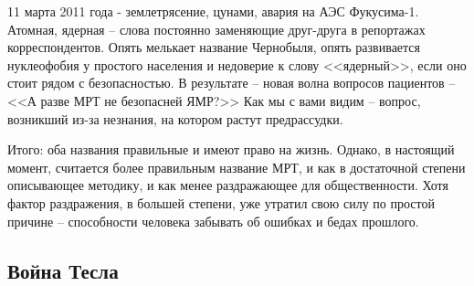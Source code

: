 11 марта 2011 года - землетрясение, цунами, авария на АЭС Фукусима-1. Атомная, ядерная -- слова постоянно заменяющие друг-друга в репортажах корреспондентов. Опять мелькает название Чернобыля, опять развивается нуклеофобия у простого населения и недоверие к слову <<ядерный>>, если оно стоит рядом с безопасностью. В результате -- новая волна вопросов пациентов -- <<А разве МРТ не безопасней ЯМР?>> Как мы с вами видим -- вопрос, возникший из-за незнания, на котором растут предрассудки. 

Итого: оба названия правильные и имеют право на жизнь. Однако, в настоящий момент, считается более правильным название МРТ, и как в достаточной степени описывающее методику, и как менее раздражающее для общественности. Хотя фактор раздражения, в большей степени, уже утратил свою силу по простой причине -- способности человека забывать об ошибках и бедах прошлого. 

\subsection{Война Тесла}





